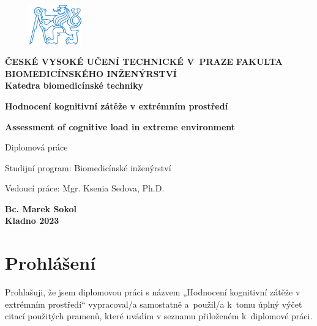 \documentclass[a4paper,12pt,czech,oneside]{memoir}
\def\uv#1{„#1“}
\numberwithin{equation}{chapter}
\newcommand{\autor}{Bc. Marek Sokol}
\newcommand{\vedouci}{Mgr. Ksenia Sedova, Ph.D.}
\newcommand{\nazev}{Hodnocení kognitivní zátěže v extrémním prostředí}
\newcommand{\nazevENG}{Assessment of cognitive load in extreme environment}
\newcommand{\typ}{Diplomová práce}
\newcommand{\rok}{2023}
\newcommand{\program}{Biomedicínské inženýrství}
\newcommand{\fakulta}{FAKULTA BIOMEDICÍNSKÉHO INŽENÝRSTVÍ}
\newcommand{\cvut}{ČESKÉ VYSOKÉ UČENÍ TECHNICKÉ V~PRAZE}
\newcommand{\katedra}{Katedra biomedicínské techniky}
\begin{document}
\pagestyle{empty}
\begin{titlingpage}
	\begin{center}
		\begin{figure}[!h]
			\centering
			\includegraphics[width=0.2\textwidth]{symbol_cvut_konturova_verze}
		\end{figure}
		\textsf{\large{\textbf{\cvut}}}
		{\color{NavyBlue}\makebox[\linewidth]{\rule[.2\baselineskip]{\textwidth}{0.4mm}}}
		\textsf{\normalsize{\textbf{\fakulta}}}\\

		\textsf{\textbf{\katedra}}

		\vfill

		\textsf{\Large{\textbf{\nazev}}}

		\vspace{36pt}

		\textsf{\Large{\textbf{\nazevENG}}}

		\vspace{48pt}

		\textsf{\typ}

		\vfill

	\end{center}
	\textsf{Studijní program: \program}

	\vspace{12pt}

	\noindent\textsf{Vedoucí práce: \vedouci}

	\vspace{24pt}

	\begin{center}
		\textsf{\textbf{\autor}} \\ [0.5cm]
		{\color{NavyBlue}\makebox[\linewidth]{\rule{\textwidth}{0.4mm}}}
		\textsf{\textbf{Kladno \rok}}
	\end{center}
\end{titlingpage}



\null\vfill
\section*{Prohlášení}
Prohlašuji, že jsem diplomovou práci s názvem \uv{\nazev} vypracoval/a
samostatně a~použil/a k~tomu úplný výčet citací použitých pramenů, které uvádím
v seznamu přiloženém k~diplomové práci.
\end{document}
